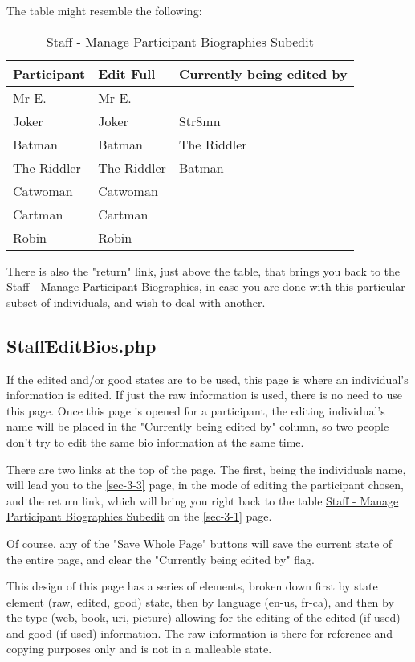 \documentclass[captions=tablesignature]{scrartcl}
\begin{document}
The table might resemble the following:
\begin{table}[htb]
\caption{\label{tbl:staffmanageparticipantbiographiessubedit}Staff - Manage Participant Biographies Subedit}
\centering
\begin{tabular}{lll}
\hline
Participant & Edit Full & Currently being edited by\\
\hline
Mr E. & Mr E. & \\
Joker & Joker & Str8mn\\
Batman & Batman & The Riddler\\
The Riddler & The Riddler & Batman\\
Catwoman & Catwoman & \\
Cartman & Cartman & \\
Robin & Robin & \\
\hline
\end{tabular}
\end{table}

There is also the "return" link, just above the table, that brings
you back to the \hyperref[tbl:staffmanageparticipantbiographies]{Staff - Manage Participant Biographies}, in case you
are done with this particular subset of individuals, and wish to
deal with another.

\subsection{StaffEditBios.php}
\label{sec-3-2}
\label{StaffEditBios.php}
If the edited and/or good states are to be used, this page is where
an individual's information is edited.  If just the raw information
is used, there is no need to use this page.  Once this page is
opened for a participant, the editing individual's name will be
placed in the "Currently being edited by" column, so two people
don't try to edit the same bio information at the same time.  

There are two links at the top of the page.  The first, being the
individuals name, will lead you to the
\ref{sec-3-3} page, in the mode of editing the
participant chosen, and the return link, which will bring you right
back to the table \hyperref[tbl:staffmanageparticipantbiographiessubedit]{Staff - Manage Participant Biographies Subedit} on
the \ref{sec-3-1} page.

Of course, any of the "Save Whole Page" buttons will save the
current state of the entire page, and clear the "Currently being
edited by" flag.

This design of this page has a series of elements, broken down
first by state element (raw, edited, good) state, then by language
(en-us, fr-ca), and then by the type (web, book, uri, picture)
allowing for the editing of the edited (if used) and good (if used)
information.  The raw information is there for reference and
copying purposes only and is not in a malleable state.
\end{document}

